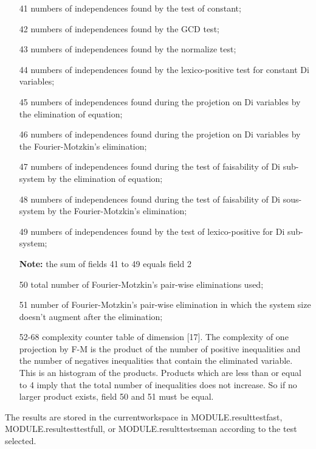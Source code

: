\begin{itemize}
    {\bf Note:} the fields 26 to 40 must be less than or equal to
    the corresponding fields 11 to 25

  \item[41] numbers of independences found by the test of constant;
  \item[42] numbers of independences found by the GCD test;
  \item[43] numbers of independences found by the normalize test;
  \item[44] numbers of independences found by the lexico-positive test
             for constant Di variables;
  \item[45] numbers of independences found during the projetion on Di
            variables by the elimination of equation;
  \item[46] numbers of independences found during the projetion on Di
            variables by the Fourier-Motzkin's elimination;
  \item[47] numbers of independences found during the test of
            faisability of  Di sub-system by the elimination of equation;
  \item[48] numbers of independences found during the test of
            faisability of Di sous-system by the Fourier-Motzkin's
            elimination; 
  \item[49] numbers of independences found by the test of lexico-positive
            for Di sub-system; 

    {\bf Note:} the sum of fields 41 to 49 equals field 2

  \item[50] total number of Fourier-Motzkin's pair-wise eliminations
     used; 
  \item[51] number of Fourier-Motzkin's pair-wise elimination 
    in which the system size doesn't augment after the elimination;
  \item[52-68] complexity counter table of dimension [17]. The
               complexity of one projection by F-M is the product of the
               number of positive inequalities and the number of negatives
               inequalities that contain the eliminated variable. This
    is an histogram of the products. Products which are less than 
    or equal to 4
    imply that the total number of inequalities does not increase.
    So if no larger product exists, field 50 and 51 must be equal.
\end{itemize}

The results are stored in the currentworkspace in MODULE.resulttestfast,
MODULE.resultesttestfull, or MODULE.resulttestseman according to the
test selected.

